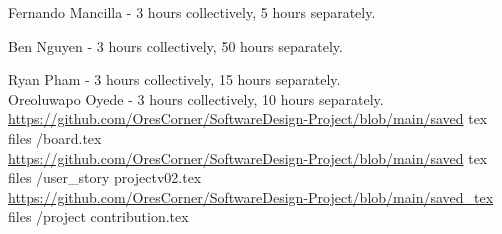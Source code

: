 \documentclass[10pt]{article}
\begin{document}
Fernando Mancilla - 3 hours collectively, 5 hours separately.

Ben Nguyen - 3 hours collectively, 50 hours separately.

Ryan Pham - 3 hours collectively, 15 hours separately.\\
Oreoluwapo Oyede - 3 hours collectively, 10 hours separately.\\
\href{https://github.com/OresCorner/SoftwareDesign-Project/blob/main/saved}{https://github.com/OresCorner/SoftwareDesign-Project/blob/main/saved} tex files /board.tex\\
\href{https://github.com/OresCorner/SoftwareDesign-Project/blob/main/saved}{https://github.com/OresCorner/SoftwareDesign-Project/blob/main/saved} tex files /user\_story projectv02.tex\\
\href{https://github.com/OresCorner/SoftwareDesign-Project/blob/main/saved_tex}{https://github.com/OresCorner/SoftwareDesign-Project/blob/main/saved\_tex} files /project contribution.tex
\end{document}
